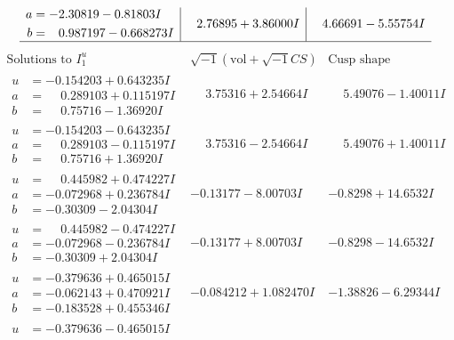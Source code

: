 \documentclass[1p]{elsarticle_modified}
\theoremstyle{definition}
\newcommand{\I}{\sqrt{-1}}
\begin{document}
$$\begin{array}{c|c|c}
\begin{aligned}
a &= -2.30819 - 0.81803 I \\
b &= \phantom{-}0.987197 - 0.668273 I\end{aligned}
 & \phantom{-}2.76895 + 3.86000 I & \phantom{-}4.66691 - 5.55754 I\\
 \hline 
 \end{array}$$\newpage$$\begin{array}{c|c|c}  
\text{Solutions to }I^u_{1}& \I (\text{vol} + \sqrt{-1}CS) & \text{Cusp shape}\\
 \hline 
\begin{aligned}
u &= -0.154203 + 0.643235 I \\
a &= \phantom{-}0.289103 + 0.115197 I \\
b &= \phantom{-}0.75716 - 1.36920 I\end{aligned}
 & \phantom{-}3.75316 + 2.54664 I & \phantom{-}5.49076 - 1.40011 I \\ \hline\begin{aligned}
u &= -0.154203 - 0.643235 I \\
a &= \phantom{-}0.289103 - 0.115197 I \\
b &= \phantom{-}0.75716 + 1.36920 I\end{aligned}
 & \phantom{-}3.75316 - 2.54664 I & \phantom{-}5.49076 + 1.40011 I \\ \hline\begin{aligned}
u &= \phantom{-}0.445982 + 0.474227 I \\
a &= -0.072968 + 0.236784 I \\
b &= -0.30309 - 2.04304 I\end{aligned}
 & -0.13177 - 8.00703 I & -0.8298 + 14.6532 I \\ \hline\begin{aligned}
u &= \phantom{-}0.445982 - 0.474227 I \\
a &= -0.072968 - 0.236784 I \\
b &= -0.30309 + 2.04304 I\end{aligned}
 & -0.13177 + 8.00703 I & -0.8298 - 14.6532 I \\ \hline\begin{aligned}
u &= -0.379636 + 0.465015 I \\
a &= -0.062143 + 0.470921 I \\
b &= -0.183528 + 0.455346 I\end{aligned}
 & -0.084212 + 1.082470 I & -1.38826 - 6.29344 I \\ \hline\begin{aligned}
u &= -0.379636 - 0.465015 I \\

\end{aligned}
\end{array}$$
\end{document}
